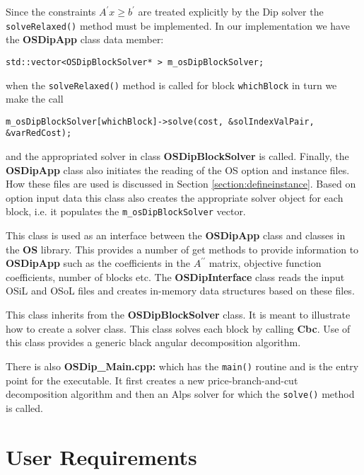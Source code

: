 \documentclass[11pt]{article}
\begin{document}
Since the constraints $A^{\prime } x \ge
b^{\prime}$ are treated explicitly by the Dip solver the {\tt solveRelaxed()}
method must be implemented. In our implementation we have the {\bf OSDipApp} class data
member:
\begin{verbatim}
std::vector<OSDipBlockSolver* > m_osDipBlockSolver;
\end{verbatim}
when the {\tt solveRelaxed()} method is called for block {\tt whichBlock} in
turn we make the call
\begin{verbatim}
m_osDipBlockSolver[whichBlock]->solve(cost, &solIndexValPair, &varRedCost);
\end{verbatim}
and the appropriated solver in class {\bf OSDipBlockSolver} is called. Finally,
the {\bf OSDipApp} class also  initiates the reading of the OS option and
instance files. How these files are used is discussed in Section \ref{section:defineinstance}. 
Based on option input
data this class also creates the appropriate solver object for each block, i.e.
it populates the {\tt  m\_osDipBlockSolver} vector.

\vskip 8pt
 This class is used  as an interface between the
{\bf OSDipApp} class and classes in the {\bf OS} library. This provides a number
of get methods to provide information to {\bf OSDipApp} such as the coefficients
in the $A^{\prime \prime}$ matrix, objective function coefficients, number of
blocks etc. The {\bf OSDipInterface} class reads the input OSiL and OSoL files
and creates in-memory data structures based on these files. 



\vskip 8pt
  This class inherits from the {\bf
OSDipBlockSolver} class. It is meant to illustrate how to create a solver class.
This class solves each block by calling {\bf Cbc}.  Use of this class provides a
generic black angular decomposition algorithm.



\vskip 8pt
There is also  {\bf OSDip\_Main.cpp:} which has the {\tt main()} routine and is
the entry point for the executable. It first creates a new price-branch-and-cut
decomposition algorithm and then an Alps solver for which the {\tt solve()}
method is called. 


\section{User Requirements}\label{section:userreq}
\end{document}
